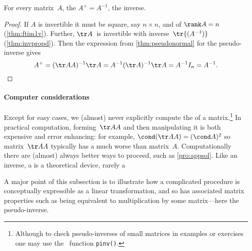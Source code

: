 \begin{theorem} \label{thm:pinvinv}
For every  matrix~\(A\), the  \(A^+=A^{-1}\), the inverse.
\end{theorem}
\begin{proof} 
If \(A\) is invertible it must be square, say \(n\times n\), and of \(\rank A=n\) (\cref{thm:ftim1v}).
Further, \(\tr A\)~is invertible with inverse~\(\tr{(A^{-1})}\) (\cref{thm:invpropd}).
Then the expression from \cref{thm:pseudonormal} for the pseudo-inverse gives
\begin{equation*}
A^+=(\tr AA)^{-1}\tr A
=A^{-1}(\tr A)^{-1}\tr A
=A^{-1}I_n=A^{-1}.
\end{equation*}
\end{proof}




\paragraph{Computer considerations} 
Except for easy cases, we (almost) never explicitly compute the  of a matrix.\footnote{Although to check pseudo-inverses of small matrices in examples or exercises one may use the \script\ function \texttt{pinv()}.}
In practical computation, forming~\(\tr AA\) and then manipulating it is both expensive and error enhancing: for example, \(\cond(\tr AA)=(\cond A)^2\) so matrix~\(\tr AA\) typically has a much worse  than matrix~\(A\).
Computationally there are (almost) always better ways to proceed, such as \cref{pro:appsol}.
Like an inverse, a  is a theoretical device, rarely a 

A major point of this subsection is to illustrate how a complicated procedure is conceptually expressible as a linear transformation, and so has associated matrix properties such as being equivalent to multiplication by some matrix---here the pseudo-inverse.







\begin{comment}
connect to normal equation?  Possibly establish the Penrose conditions, \(AA^+A=A\), \(A^+AA^+=A^+\), and \(AA^+\) and \(A^+A\) are symmetric, but as yet I do not see any need.
\end{comment}







